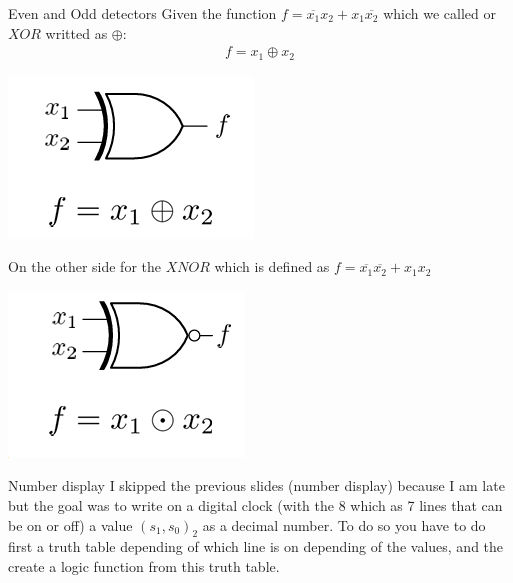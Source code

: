 \begin{parag}{Even and Odd detectors}
    Given the function $f = \overline{x_1}x_2 + x_1 \overline{x_2}$ which we called  or $XOR$ writted as $\oplus$:
    \begin{align*}
        f = x_1 \oplus x_2
    \end{align*}
    \begin{center}
        \includegraphics[scale=0.8]{xor2025-03-10.png}
    \end{center}
    On the other side for the $XNOR$ which is defined as $f = \overline{x_1} \overline{x_2} + x_1x_2$
    \begin{center}
        \includegraphics[scale=0.8]{xnor2025-03-10.png}
    \end{center}
    
\end{parag}
\begin{parag}{Number display}
    I skipped the previous slides (number display) because I am late but the goal was to write on a digital clock (with the 8 which as 7 lines that can be on or off) a value $(s_1, s_0)_2$ as a decimal number. To do so you have to do first a truth table depending of which line is on depending of the values, and the create a logic function from this truth table.
\end{parag}
